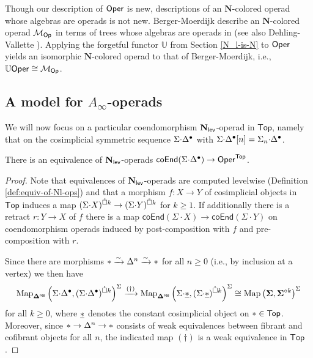\begin{remark}
 \label{trees-rmk}
    Though our description of $\mathsf{Oper}$ is new, descriptions of an $\mathbf{N}$-colored operad whose algebras are operads is not new. Berger-Moerdijk describe an $\mathbf{N}$-colored operad $\mathcal{M}_{\textsf{Op}}$ in terms of trees whose algebras are operads in \cite[1.5.6]{BM-trees} (see also Dehling-Vallette \cite{Deh-Val}). Applying the forgetful functor $\mathbb{U}$ from Section \ref{N_l-is-N} to $\mathsf{Oper}$ yields an isomorphic $\mathbf{N}$-colored operad to that of Berger-Moerdijk, i.e., $\mathbb{U}\mathsf{Oper}\cong \mathcal{M}_{\mathsf{Op}}$.
\end{remark}

\subsection{A model for $A_{\infty}$-operads} \label{sec:A}
We will now focus on a particular coendomorphism $\mathbf{N}_{\mathsf{lev}}$-operad in $\mathsf{Top}$, namely that on the cosimplicial symmetric sequence $\Sigma{\cdot}\Delta^{\bullet}$ with $\Sigma{\cdot}\Delta^{\bullet}[n]=\Sigma_n {\cdot} \Delta^{\bullet}$. 

\begin{proposition}\label{A-equiv-to-E} 
There is an equivalence of $\mathbf{N}_{\mathsf{lev}}$-operads $\mathsf{coEnd}(\Sigma{\cdot}\Delta^{\bullet}) \to \mathsf{Oper}^{\mathsf{Top}}$. %
\end{proposition}

\begin{proof} Note that equivalences of $\mathbf{N}_{\mathsf{lev}}$-operads are computed levelwise (Definition \ref{def:equiv-of-Nl-ops}) and that a morphism $f\colon X\to Y$ of cosimplicial objects in $\mathsf{Top}$ induces a map $(\Sigma {\cdot} X)^{\mathring{\square} k}\to (\Sigma {\cdot} Y)^{\mathring{\square} k}$ for $k\geq 1$. If additionally there is a retract $r\colon Y\to X$ of $f$ there is a map $\mathsf{coEnd}(\Sigma {\cdot} X)\to \mathsf{coEnd}(\Sigma{\cdot} Y)$ on coendomorphism operads induced by post-composition with $f$ and pre-composition with $r$.

Since there are morphisms $* \xrightarrow{\sim}\Delta^n\xrightarrow{\sim} *$ for all $n \geq 0$ (i.e., by inclusion at a vertex) we then have  \begin{align*}
    \operatorname{Map}_{\mathbf{\Delta}^{\mathsf{res}}}\left(\Sigma{\cdot}\Delta^{\bullet},(\Sigma{\cdot}\Delta^{\bullet})^{\mathring{\square} k}\right)^{\Sigma}
    \xrightarrow{(\dagger)}\operatorname{Map}_{\mathbf{\Delta}^{\mathsf{res}}}\left(\Sigma{\cdot}\underline{*}, (\Sigma{\cdot}\underline{*})^{\mathring{\square} k}\right)^{\Sigma}\cong \operatorname{Map}\left(\mathbf{\Sigma}, \mathbf{\Sigma}^{\circ k}\right)^{\Sigma}
\end{align*}
for all $k \geq 0$, where $\underline{*}$ denotes the constant cosimplicial object on $*\in \mathsf{Top}$. Moreover, since $* \to \Delta^n\to *$ consists of weak equivalences between fibrant and cofibrant objects for all $n$, the indicated map $(\dagger)$ is a weak equivalence in $\mathsf{Top}$.
\end{proof}

